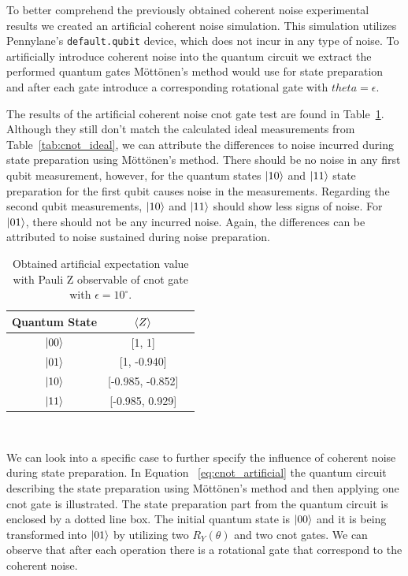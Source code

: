 To better comprehend the previously obtained coherent noise experimental
results we created an artificial coherent noise simulation. This
simulation utilizes Pennylane's \colorbox{inline_gray}{\lstinline|default.qubit|}
device, which does not incur in any type of noise. To artificially
introduce coherent noise into the quantum circuit we extract the
performed quantum gates Möttönen's method would use for state
preparation and after each gate introduce a corresponding rotational
gate with \(theta = \epsilon\). \

The results of the artificial coherent noise \ac{cnot} gate test are found
in Table~\ref{tab:cnot_artificial_noise}. Although they still don't
match the calculated ideal measurements from Table~\ref{tab:cnot_ideal},
we can attribute the differences to noise incurred during state preparation
using Möttönen's method. There should be no noise in any first qubit
measurement, however, for the quantum states \(\ket{10}\) and \(\ket{11}\)
state preparation for the first qubit causes noise in the measurements.
Regarding the second qubit measurements, \(\ket{10}\) and \(\ket{11}\)
should show less signs of noise. For \(\ket{01}\), there should not be
any incurred noise. Again, the differences can be attributed to noise
sustained during noise preparation. \

\begin{table}[h]
  \centering
  \begin{tabular}{|c|c|c|}
    \hline
    Quantum State & \(\expval{Z}\) \\
    \hline
    \(\ket{00}\) & [1, 1] \\
    \hline
    \(\ket{01}\) & [1, -0.940] \\
    \hline
    \(\ket{10}\) & [-0.985, -0.852] \\
    \hline
    \(\ket{11}\) & [-0.985, 0.929] \\
    \hline
  \end{tabular}
  \caption{Obtained artificial expectation value with Pauli Z observable of \ac{cnot} gate with \(\epsilon = 10^{\circ}\).}\label{tab:cnot_artificial_noise}
\end{table} \

We can look into a specific case to further specify the influence
of coherent noise during state preparation. In Equation
~\ref{eq:cnot_artificial} the quantum circuit describing the state
preparation using Möttönen's method and then applying one \ac{cnot} gate
is illustrated. The state preparation part from the quantum circuit is
enclosed by a dotted line box. The initial quantum state is \(\ket{00}\)
and it is being transformed into \(\ket{01}\) by utilizing two
\(R_{Y}(\theta)\) and two \ac*{cnot} gates. We can observe that after
each operation there is a rotational gate that correspond to the coherent
noise. \

